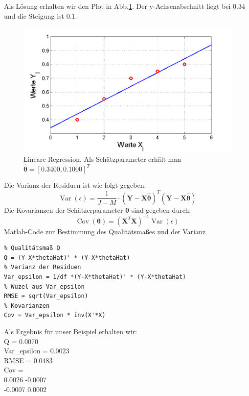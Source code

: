 Als Lösung erhalten wir den Plot in Abb.\ref{fig:LineareRegression}.
Der y-Achsenabschnitt liegt bei 0.34 und die Steigung ist 0.1.
\begin{figure}[!htp]
	\begin{center}
		\includegraphics[width=140mm]{02_vorlesung/media/LinRegression.png}
		\caption{Lineare Regression. 
			Als Schätzparameter erhält man $\hat{\boldsymbol\theta} = [ 0.3400 ,0.1000 ]^T$}
		\label{fig:LineareRegression}
	\end{center}
\end{figure}
Die Varianz der Residuen ist wie folgt gegeben:
\begin{equation}
\operatorname{Var}(\epsilon) = \frac{1}{J-M} \cdot \left(\mathbf Y - \mathbf X \hat{\boldsymbol\theta}\right)^T 
\left(\mathbf Y - \mathbf X \hat{\boldsymbol\theta}\right)
\end{equation}
Die Kovarianzen der Schätzerparameter ${\boldsymbol\theta}$ 
sind gegeben durch:
\begin{equation}
\operatorname{Cov}(\boldsymbol\theta) = \left(\mathbf{X}^T \mathbf X \right)^{-1}
\operatorname{Var}(\epsilon)
\end{equation}
Matlab-Code zur Bestimmung des Qualitätsmaßes und der Varianz
\begin{verbatim}
% Qualitätsmaß Q
Q = (Y-X*thetaHat)' * (Y-X*thetaHat)
% Varianz der Residuen
Var_epsilon = 1/df *(Y-X*thetaHat)' * (Y-X*thetaHat)
% Wuzel aus Var_epsilon
RMSE = sqrt(Var_epsilon)
% Kovarianzen
Cov = Var_epsilon * inv(X'*X)
\end{verbatim}
Als Ergebnis für unser Beispiel erhalten wir:\\
Q = 0.0070 \\
Var\_epsilon = 0.0023\\
RMSE = 0.0483 \\
Cov = \\
0.0026   -0.0007 \\
-0.0007    0.0002 \\

